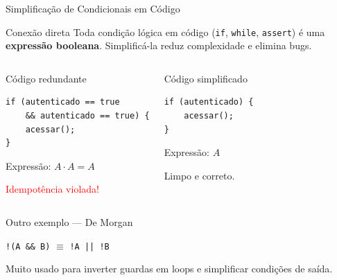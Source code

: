 \documentclass[9pt]{beamer}
\begin{document}
\begin{frame}[fragile]{Simplificação de Condicionais em Código}

\begin{block}{Conexão direta}
Toda condição lógica em código (\texttt{if}, \texttt{while}, \texttt{assert}) é uma \textbf{expressão booleana}. Simplificá-la reduz complexidade e elimina bugs.
\end{block}

\vspace{0.2cm}

\begin{columns}


\begin{alertblock}{Código redundante}
\begin{verbatim}
if (autenticado == true
    && autenticado == true) {
    acessar();
}
\end{verbatim}
Expressão: $A \cdot A = A$

\vspace{0.1cm}
\textcolor{red}{Idempotência violada!}
\end{alertblock}


\begin{block}{Código simplificado}
\begin{verbatim}
if (autenticado) {
    acessar();
}
\end{verbatim}
Expressão: $A$

\vspace{0.1cm}
\textcolor{structure}{Limpo e correto.}
\end{block}

\end{columns}

\vspace{0.3cm}

\begin{block}{Outro exemplo — De Morgan}
\begin{center}
\texttt{!(A \&\& B)} $\equiv$ \texttt{!A || !B}
\end{center}
Muito usado para inverter guardas em loops e simplificar condições de saída.
\end{block}

\end{frame}
\end{document}
